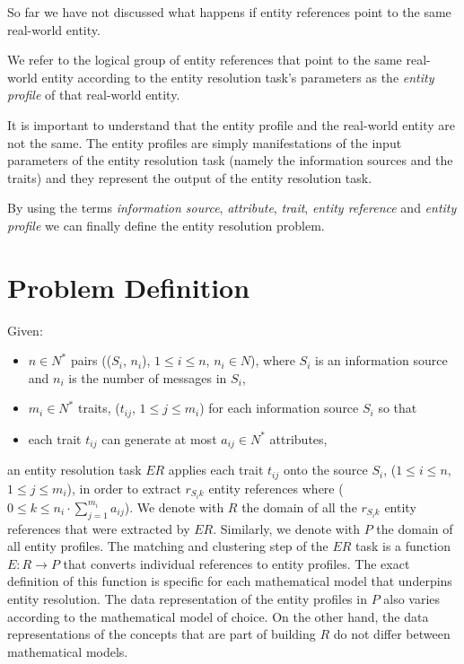 \documentclass[11pt]{article}
\begin{document}
    So far we have not discussed what happens if entity references point to the
    same real-world entity.
    
    \begin{defn}
        We refer to the logical group of entity references that point to
        the same real-world entity according to the entity resolution task's
        parameters as the \textit{entity profile} of that real-world entity.
    \end{defn}

    It is important to understand that the entity profile and the real-world
    entity are not the same.
    The entity profiles are simply manifestations of the input parameters of the
    entity resolution task (namely the information sources and the traits) and
    they represent the output of the entity resolution task.
    
    By using the terms \textit{information source}, \textit{attribute},
    \textit{trait}, \textit{entity reference} and \textit{entity profile} we can
    finally define the entity resolution problem.

    \section{Problem Definition}\label{sec:problem}

    Given:
    \begin{itemize}
        \item $n \in N^*$ pairs (($S_i$, $n_i$), $1 \leq i \leq n$, $n_i \in N$), 
        where $S_i$ is an information source and $n_i$ is the number of messages
        in $S_i$,
        \item $m_i \in N^*$ traits, ($t_{ij}$, $1 \leq j \leq m_i$) for each
        information source $S_i$ so that
        \item each trait $t_{ij}$ can generate at most $a_{ij} \in N^*$
        attributes,
    \end{itemize}
    an entity resolution task $ER$ applies each trait $t_{ij}$ onto the source
    $S_i$, ($1 \leq i \leq n$, $1 \leq j \leq m_i$), in order to extract
    $r_{{S_i}k}$ entity references where
    ($0 \leq k \leq n_i \cdot \sum^{m_i}_{j=1}a_{ij}$).
    We denote with $R$ the domain of all the $r_{{S_i}k}$ entity references that
    were extracted by $ER$.
    Similarly, we denote with $P$ the domain of all entity profiles.
    The matching and clustering step of the $ER$ task is a function
    $E: R \rightarrow P$ that converts individual references to entity profiles.
    The exact definition of this function is specific for each mathematical
    model that underpins entity resolution.
    The data representation of the entity profiles in $P$ also varies according
    to the mathematical model of choice.
    On the other hand, the data representations of the concepts that are part of
    building $R$ do not differ between mathematical models.
\end{document}
